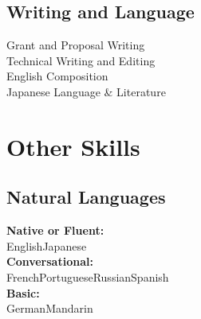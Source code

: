 \documentclass[letterpaper]{deedy-resume} %
\begin{document}
\begin{minipage}[t]{0.32\textwidth}
\sectionspace

\subsection{Writing and Language}
\textbullet{}Grant and Proposal Writing\\
\textbullet{}Technical Writing and Editing\\
\textbullet{}English Composition\\
\textbullet{}Japanese Language \& Literature

\section{Other Skills}
\sectionspace

\subsection{Natural Languages}
\textbf{Native or Fluent:}\\English\textbullet{}Japanese\\
\textbf{Conversational:} \\French\textbullet{}Portuguese\textbullet{}Russian\textbullet{}Spanish\\
\textbf{Basic:}\\German\textbullet{}Mandarin

\sectionspace


\end{minipage}
\end{document}
